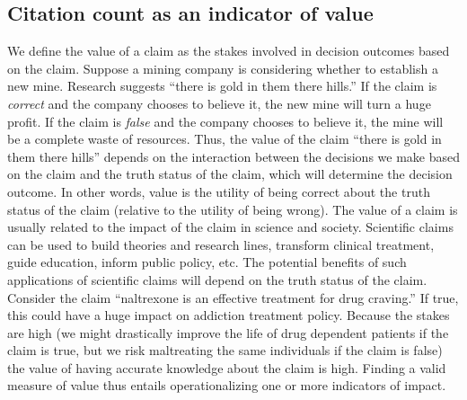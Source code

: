 \documentclass[
  english,
  jou,floatsintext]{apa6}
\begin{document}
\hypertarget{citation-count-as-an-indicator-of-value}{%
\subsection{Citation count as an indicator of value}\label{citation-count-as-an-indicator-of-value}}

We define the value of a claim as the stakes involved in decision outcomes based on the claim. Suppose a mining company is considering whether to establish a new mine. Research suggests ``there is gold in them there hills.'' If the claim is \emph{correct} and the company chooses to believe it, the new mine will turn a huge profit. If the claim is \emph{false} and the company chooses to believe it, the mine will be a complete waste of resources. Thus, the value of the claim ``there is gold in them there hills'' depends on the interaction between the decisions we make based on the claim and the truth status of the claim, which will determine the decision outcome. In other words, value is the utility of being correct about the truth status of the claim (relative to the utility of being wrong). The value of a claim is usually related to the impact of the claim in science and society. Scientific claims can be used to build theories and research lines, transform clinical treatment, guide education, inform public policy, etc. The potential benefits of such applications of scientific claims will depend on the truth status of the claim. Consider the claim ``naltrexone is an effective treatment for drug craving.'' If true, this could have a huge impact on addiction treatment policy. Because the stakes are high (we might drastically improve the life of drug dependent patients if the claim is true, but we risk maltreating the same individuals if the claim is false) the value of having accurate knowledge about the claim is high. Finding a valid measure of value thus entails operationalizing one or more indicators of impact.
\end{document}
